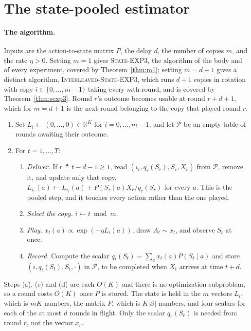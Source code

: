 \documentclass{article}
\theoremstyle{remark}
\newcommand{\Sset}{\mathcal{S}}
\begin{document}
\appendix

\section{The state-pooled estimator}\label{app:pool}

\paragraph{The algorithm.} Inputs are the action-to-state matrix $P$, the delay $d$, the number
of copies $m$, and the rate $\eta>0$. Setting $m=1$ gives \textsc{State-EXP3}, the algorithm of the
body and of every experiment, covered by Theorem~\ref{thm:m1}; setting $m=d+1$ gives a distinct
algorithm, \textsc{Interleaved-State-EXP3}, which runs $d+1$ copies in rotation with copy
$i\in\{0,\dots,m-1\}$ taking every $m$th round, and is covered by Theorem~\ref{thm:sexp3}. Round
$r$'s outcome becomes usable at round $r+d+1$, which for $m=d+1$ is the next round belonging to the
copy that played round $r$.

\begin{enumerate}\itemsep1pt \parskip0pt 
\item Set $L_i\leftarrow(0,\dots,0)\in\mathbb R^K$ for $i=0,\dots,m-1$, and let $\mathcal P$ be
an empty table of rounds awaiting their outcome.
\item For $t=1,\dots,T$:
\begin{enumerate}\itemsep1pt \parskip0pt 
\item \emph{Deliver.} If $r\triangleq t-d-1\ge1$, read $(i_r,q_r(S_r),S_r,X_r)$ from
$\mathcal P$, remove it, and update only that copy,
$L_{i_r}(a)\leftarrow L_{i_r}(a)+P(S_r\mid a)X_r/q_r(S_r)$ for every $a$. This is the pooled
step, and it touches every action rather than the one played.
\item \emph{Select the copy.} $i\leftarrow t\bmod m$.
\item \emph{Play.} $x_t(a)\propto\exp(-\eta L_i(a))$, draw $A_t\sim x_t$, and observe $S_t$
at once.
\item \emph{Record.} Compute the scalar $q_t(S_t)=\sum_ax_t(a)P(S_t\mid a)$ and store
$(i,q_t(S_t),S_t,\cdot)$ in $\mathcal P$, to be completed when $X_t$ arrives at time $t+d$.
\end{enumerate}
\end{enumerate}

Steps (a), (c) and (d) are each $O(K)$ and there is no optimization subproblem, so a round costs
$O(K)$ once $P$ is stored. The state is held in the $m$ vectors $L_i$, which is $mK$ numbers, the
matrix $P$, which is $K|\Sset|$ numbers, and four scalars for each of the at most $d$ rounds in
flight. Only the scalar $q_r(S_r)$ is needed from round $r$, not the vector $x_r$.
\end{document}
